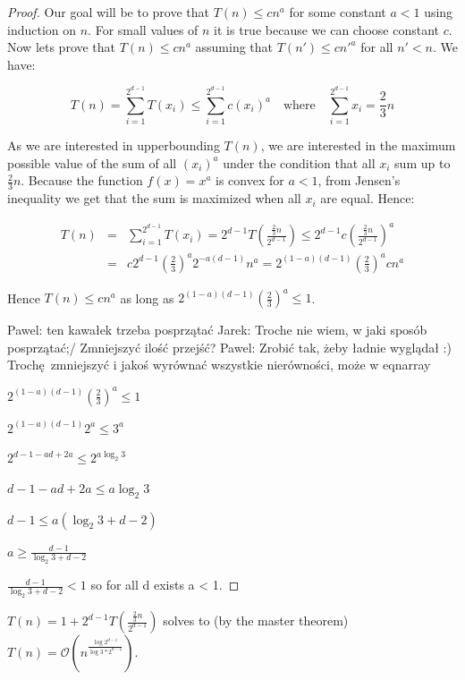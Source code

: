 \documentclass[10pt,a4paper]{article}
\newcommand{\pawel}[1]{\noindent\colorbox{myRed}{Pawel: #1}}
\newcommand{\jarek}[1]{\noindent\colorbox{myYellow}{Jarek: #1}}
\newcommand{\Oh}{\mathcal{O}}
\begin{document}
\begin{proof}

Our goal will be to prove that $T(n) \leq c n^a$ for some constant $a < 1$ using induction on $n$. For small values of $n$ it is true because we can choose constant $c$. Now lets prove that $T(n) \leq c n^a$ assuming that $T(n') \leq c n'^a$ for all $n'<n$. We have:

$$T(n) = \displaystyle\sum\limits_{i=1}^{2^{d-1}} T(x_i)\leq\displaystyle\sum\limits_{i=1}^{2^{d-1}} c(x_i)^{a}  \quad\text{where}\quad  \displaystyle\sum\limits_{i=1}^{2^{d-1}} x_i = \frac{2}{3}n$$ 

As we are interested in upperbounding $T(n)$, we are interested in the maximum possible value of the sum of all $(x_i)^{a}$ under the condition that all $x_{i}$ sum up to $\frac{2}{3}n$. Because the function $f(x)=x^{a}$ is convex for $a<1$, from Jensen's inequality we get that the sum is maximized when all $x_{i}$ are equal. Hence:

\begin{eqnarray*}
T(n) &=& \displaystyle\sum\limits_{i=1}^{2^{d-1}} T(x_i) = 2^{d-1} T\left(\frac{\frac{2}{3}n}{2^{d-1}}\right) \leq 2^{d-1} c \left(\frac{\frac{2}{3}n}{2^{d-1}}\right) ^ a  \\
& = & c 2^{d-1} \left(\frac{2}{3}\right)^a 2^{-a(d-1)} n^a = 2^{(1-a)(d-1)} \left(\frac{2}{3}\right)^a c n^a
\end{eqnarray*}

Hence $T(n)\leq c n^{a}$ as long as $2^{(1-a)(d-1)} (\frac{2}{3})^a \leq 1$.
\bigskip

\pawel{ten kawałek trzeba posprzątać}
\jarek{Troche nie wiem, w jaki sposób posprzątać;/ Zmniejszyć ilość przejść?}
\pawel{Zrobić tak, żeby ładnie wyglądał :) Trochę zmniejszyć i jakoś wyrównać wszystkie nierówności, może w eqnarray}

$2^{(1-a)(d-1)} (\frac{2}{3})^a \leq 1$

$2^{(1-a)(d-1)} 2^a \leq 3^a$

$2^{d-1-ad+2a} \leq 2^{a \log_2{3}}$

$d-1-ad+2a \leq a \log_2{3}$

$d-1 \leq a (\log_2{3} + d - 2)$

$a \geq \frac{d-1}{\log_2{3} + d - 2} $

$\frac{d-1}{\log_2{3} + d - 2} < 1$ so for all d exists a < 1.

\end{proof}

$T(n)=1+2^{d-1}T(\frac{\frac{2}{3}n}{2^{d-1}})$ solves to (by the master theorem) $T(n)=\Oh(n^{\frac{\log 2^{d-1}}{\log 3*2^{d-2}}})$.
\end{document}
